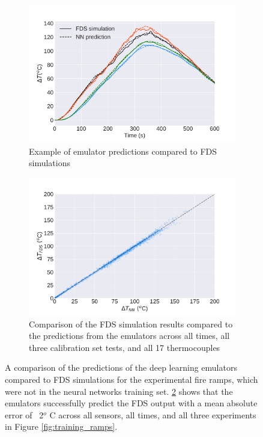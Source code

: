 \documentclass{article}
\begin{document}
\begin{figure}[htbp]
  \centering
  \begin{subfigure}[t]{.45\textwidth}
      \centering
      \includegraphics[width=\textwidth,keepaspectratio]{figures/forward_NN_examples.pdf}
      \caption{Example of emulator predictions compared to FDS simulations }
      \label{fig:forward_NN_examples}
  \end{subfigure}
  \begin{subfigure}[t]{.45\textwidth}
      \centering
      \includegraphics[width=\textwidth ,keepaspectratio]{figures/forward_error_scatter.pdf}
      \caption{Comparison of the FDS simulation results compared to the predictions from the emulators across all times, all three calibration set tests, and all 17 thermocouples }
      \label{fig:forward_error_scatter}
  \end{subfigure}
  \caption{A comparison of the predictions of the deep learning emulators compared to FDS simulations for the experimental fire ramps, which were not in the neural networks training set. \protect\ref{fig:forward_error_scatter} shows that the emulators successfully predict the FDS output with a mean absolute error of ~2$^o$ C across all sensors, all times, and all three experiments in Figure \protect\ref{fig:training_ramps}.} 
  \label{fig:forward_error}
\end{figure}
\end{document}
